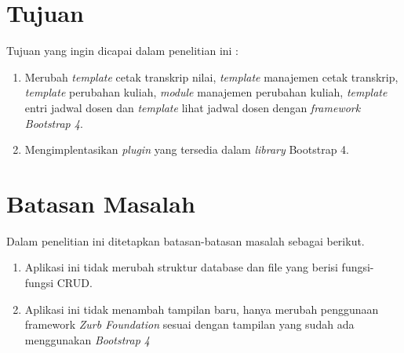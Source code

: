 \section{Tujuan}
\label{sec:tujuan}
Tujuan yang ingin dicapai dalam penelitian ini :

	\begin{enumerate}	
	\item Merubah \textit{template} cetak transkrip nilai, \textit{template} manajemen cetak transkrip, \textit{template} perubahan kuliah, \textit{module} manajemen perubahan kuliah, \textit{template} entri jadwal dosen dan \textit{template} lihat jadwal dosen dengan \textit{framework Bootstrap 4}.
	\item Mengimplentasikan \textit{plugin} yang tersedia dalam \textit{library} Bootstrap 4.
	\end{enumerate}

\section{Batasan Masalah}
\label{sec:batasan}
%
Dalam penelitian ini ditetapkan batasan-batasan masalah sebagai berikut.
\begin{enumerate}	
	\item Aplikasi ini tidak merubah struktur database dan file yang berisi fungsi-fungsi CRUD.
	\item Aplikasi ini tidak menambah tampilan baru, hanya merubah penggunaan framework \textit{Zurb Foundation} sesuai dengan tampilan yang sudah ada menggunakan \textit{Bootstrap 4}
	\end{enumerate}		


